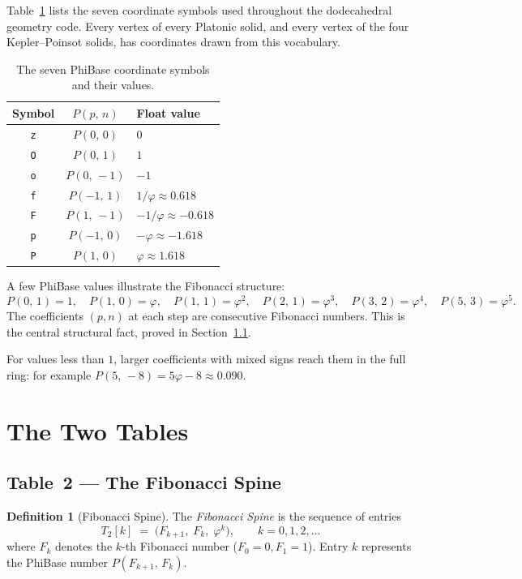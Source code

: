 \documentclass[12pt]{article}
\theoremstyle{definition}
\newtheorem{definition}[theorem]{Definition}
\theoremstyle{remark}
\newcommand{\Phib}[2]{P(#1,\,#2)}
\begin{document}
\medskip
Table~\ref{tab:decode} lists the seven coordinate symbols used throughout
the dodecahedral geometry code.  Every vertex of every Platonic solid,
and every vertex of the four Kepler--Poinsot solids, has coordinates
drawn from this vocabulary.

\begin{table}[h]
\centering
\caption{The seven PhiBase coordinate symbols and their values.}
\label{tab:decode}
\begin{tabular}{ccl}
\toprule
Symbol & $\Phib{p}{n}$ & Float value \\
\midrule
\texttt{z} & $\Phib{0}{0}$  & $0$ \\
\texttt{O} & $\Phib{0}{1}$  & $1$ \\
\texttt{o} & $\Phib{0}{-1}$ & $-1$ \\
\texttt{f} & $\Phib{-1}{1}$ & $1/\varphi \approx 0.618$ \\
\texttt{F} & $\Phib{1}{-1}$ & $-1/\varphi \approx -0.618$ \\
\texttt{p} & $\Phib{-1}{0}$ & $-\varphi \approx -1.618$ \\
\texttt{P} & $\Phib{1}{0}$  & $\varphi \approx 1.618$ \\
\bottomrule
\end{tabular}
\end{table}

\medskip
A few PhiBase values illustrate the Fibonacci structure:
\[
  \Phib{0}{1}=1,\quad
  \Phib{1}{0}=\varphi,\quad
  \Phib{1}{1}=\varphi^{2},\quad
  \Phib{2}{1}=\varphi^{3},\quad
  \Phib{3}{2}=\varphi^{4},\quad
  \Phib{5}{3}=\varphi^{5}.
\]
The coefficients $(p,n)$ at each step are consecutive Fibonacci numbers.
This is the central structural fact, proved in Section~\ref{sec:spine}.

For values less than $1$, larger coefficients with mixed signs reach
them in the full ring: for example $\Phib{5}{-8} = 5\varphi - 8
\approx 0.090$.

\section{The Two Tables}

\subsection{Table~2 — The Fibonacci Spine}
\label{sec:spine}

\begin{definition}[Fibonacci Spine]
The \emph{Fibonacci Spine} is the sequence of entries
\[
  T_2[k] \;=\; \bigl(F_{k+1},\; F_k,\; \varphi^k\bigr),
  \qquad k = 0, 1, 2, \ldots
\]
where $F_k$ denotes the $k$-th Fibonacci number ($F_0=0,F_1=1$).
Entry $k$ represents the PhiBase number $\Phib{F_{k+1}}{F_k}$.
\end{definition}
\end{document}
